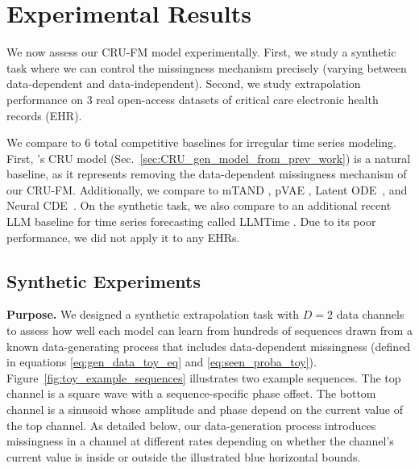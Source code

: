 \section{Experimental Results}
We now assess our CRU-FM model experimentally.
First, we study a synthetic task where we can control the missingness mechanism precisely (varying between data-dependent and data-independent). 
Second, we study extrapolation performance on 3 real open-access datasets of critical care electronic health records (EHR).



We compare to 6 total competitive baselines for irregular time series modeling.
First, 
\citet{schirmer2022modeling}'s CRU model (Sec.~\ref{sec:CRU_gen_model_from_prev_work}) is a natural baseline, as it represents removing the data-dependent missingness mechanism of our CRU-FM.
Additionally, we compare to 
 mTAND \citep{shukla2021multitime}, pVAE \citep{li2020learning},
 Latent ODE~\citep{rubanova2019latent}, and Neural CDE~\citep{kidger2020neural}. 
On the synthetic task, we also compare to an additional recent LLM baseline for time series forecasting called LLMTime \citep{gruver2023large}. Due to its poor performance, we did not apply it to any EHRs.


\subsection{Synthetic Experiments}
\label{sec:synthetic_experiment}


\textbf{Purpose.}
We designed a synthetic extrapolation task with $D{=}2$ data channels to assess how well each model can learn from hundreds of sequences drawn from a known data-generating process that includes data-dependent missingness (defined in equations \ref{eq:gen_data_toy_eq} and \ref{eq:seen_proba_toy}).
Figure~\ref{fig:toy_example_sequences} illustrates two example sequences.
The top channel is a square wave with a sequence-specific phase offset.
The bottom channel is a sinusoid whose amplitude and phase depend on the  current value of the top channel.  
As detailed below, our data-generation process introduces missingness in a channel at different rates depending on whether the channel's current value is inside or outside the illustrated blue horizontal bounds. 

